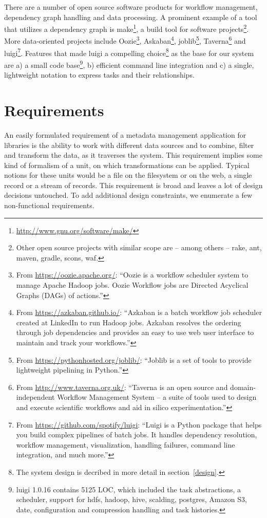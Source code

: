 \documentclass[english]{lni}
\begin{document}
There are a number of open source software products for workflow
management, dependency graph handling and data processing.
A prominent example of a tool that utilizes a dependency graph is make\footnote{\url{http://www.gnu.org/software/make/}}, a build tool for software projects\footnote{Other open source projects with similar scope are -- among others -- rake, ant, maven, gradle, scons, waf.}.
More data-oriented projects include
Oozie\footnote{From \url{https://oozie.apache.org/}: ``Oozie is a workflow scheduler system to manage Apache Hadoop jobs.
Oozie Workflow jobs are Directed Acyclical Graphs (DAGs) of actions.''},
Askaban\footnote{From \url{https://azkaban.github.io/}: ``Azkaban is a batch workflow job scheduler created at LinkedIn to run Hadoop jobs. Azkaban resolves the ordering through job dependencies and provides an easy to use web user interface to maintain and track your workflows.''}, joblib\footnote{From \url{https://pythonhosted.org/joblib/}: ``Joblib is a set of tools to provide lightweight pipelining in Python.''}, Taverna\footnote{From \url{http://www.taverna.org.uk/}: ``Taverna is an open source and domain-independent Workflow Management System -- a suite of tools used to design and execute scientific workflows and aid in silico experimentation.''} and luigi\footnote{From \url{https://github.com/spotify/luigi}: ``Luigi is a Python package that helps you build complex pipelines of batch jobs. It handles dependency resolution, workflow management, visualization, handling failures, command line integration, and much more.''}.
Features that made luigi a compelling choice\footnote{The system design is decribed in more detail in section~\ref{design}.} as the base
for our system are a) a small code base\footnote{luigi 1.0.16 contains 5125 LOC, which included the task abstractions, a scheduler, support for hdfs, hadoop, hive, scalding, postgres, Amazon S3, date, configuration and compression handling and task histories.}, b) efficient command line integration and c) a single, lightweight notation to express tasks and their relationships.

\section{Requirements}
\label{requirements}

An easily formulated requirement of a metadata management application
for libraries is the ability to work with different data sources and to
combine, filter and transform the data, as it traverses the system. This requirement
implies some kind of formalism of a unit, on which transformations can be applied.
Typical notions for these units would be a file on the filesystem or on the web, a single
record or a stream of records. This requirement is broad and leaves a lot of design decisions untouched. To add additional design constraints, we enumerate a few non-functional requirements.
\end{document}
